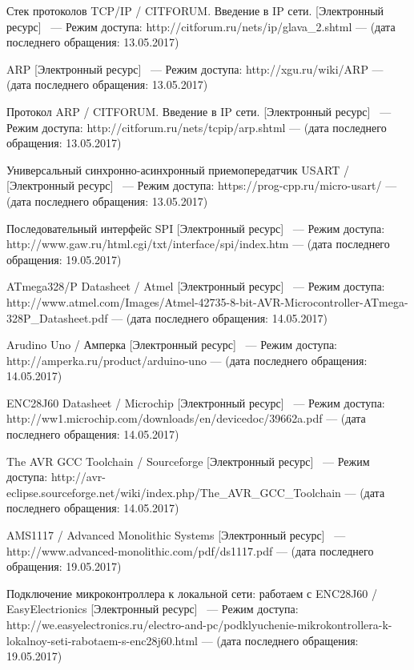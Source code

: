 \documentclass[utf8x,14pt, coursreport]{G7-32}
\begin{document}
\begin{thebibliography}{99}
 Стек протоколов TCP/IP / CITFORUM. Введение в IP сети. [Электронный ресурс] ~--- Режим доступа: http://citforum.ru/nets/ip/glava\_2.shtml --- (дата последнего обращения: 13.05.2017)

 ARP [Электронный ресурс] ~--- Режим доступа: http://xgu.ru/wiki/ARP --- (дата последнего обращения: 13.05.2017)

  Протокол ARP  / CITFORUM. Введение в IP сети. [Электронный ресурс] ~--- Режим доступа: http://citforum.ru/nets/tcpip/arp.shtml --- (дата последнего обращения: 13.05.2017)

 Универсальный синхронно-асинхронный приемопередатчик USART / [Электронный ресурс] ~--- Режим доступа: https://prog-cpp.ru/micro-usart/ --- (дата последнего обращения: 13.05.2017)

 Последовательный интерфейс SPI [Электронный ресурс] ~--- Режим доступа: http://www.gaw.ru/html.cgi/txt/interface/spi/index.htm --- (дата последнего обращения: 19.05.2017)

 ATmega328/P Datasheet / Atmel [Электронный ресурс] ~--- Режим доступа: http://www.atmel.com/Images/Atmel-42735-8-bit-AVR-Micro\-controller-\-AT\-me\-ga-328P\_Datasheet.pdf --- (дата последнего обращения: 14.05.2017)

 Arudino Uno / Амперка [Электронный ресурс] ~--- Режим доступа: http://amperka.ru/product/arduino-uno --- (дата последнего обращения: 14.05.2017)

 ENC28J60 Datasheet / Microchip  [Электронный ресурс] ~--- Режим доступа: http://ww1.microchip.com/downloads/en/devicedoc/39662a.pdf --- (дата последнего обращения: 14.05.2017)

 The AVR GCC Toolchain / Sourceforge [Электронный ресурс] ~--- Режим доступа: http://avr-eclipse.sourceforge.net/wiki/index.php/The\_AVR\_GCC\_Toolchain --- (дата последнего обращения: 14.05.2017)

 AMS1117 / Advanced Monolithic Systems [Электронный ресурс] ~--- http://www.advanced-monolithic.com/pdf/ds1117.pdf --- (дата последнего обращения: 19.05.2017)

 Подключение микроконтроллера к локальной сети: работаем с ENC28J60  / EasyElectrionics [Электронный ресурс] ~--- Режим доступа: http://we.easyelectronics.ru/electro-and-pc/podklyuchenie-mikrok\-ont\-ro\-lle\-ra-k-lo\-ka\-lnoy-se\-ti-ra\-botaem-s-enc28j60.html --- (дата последнего обращения: 19.05.2017)

\end{thebibliography}
\end{document}
